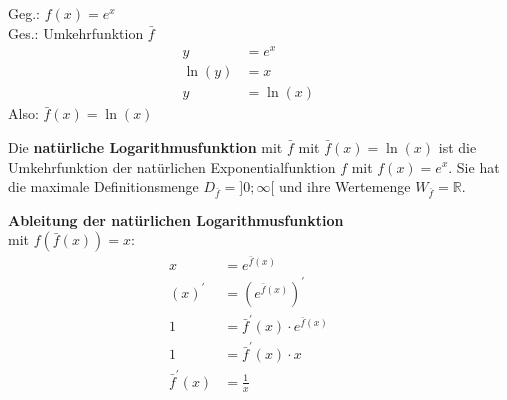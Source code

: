 \begin{minipage}{0.35\textwidth}
    Geg.: $f(x) = e^x$\\
    Ges.: Umkehrfunktion $\bar{f}$
    \begin{align*}
        y & = e^x && \\
        \ln{(y)} & = x && \\
        y & = \ln{(x)} &&
    \end{align*}
    Also: $\bar{f}(x) = \ln{(x)}$
\end{minipage}
\begin{minipage}{0.65\textwidth}
\end{minipage}
\begin{definition}
    Die \textbf{natürliche Logarithmusfunktion} mit $\bar{f}$ mit $\bar{f}(x) = \ln{(x)}$ ist die Umkehrfunktion der natürlichen Exponentialfunktion $f$ mit $f(x) = e^x$. Sie hat die maximale Definitionsmenge $D_{\bar{f}} = ]0;\infty[$ und ihre Wertemenge $W_{\bar{f}} = \mathbb{R}$.
\end{definition}

\textbf{Ableitung der natürlichen Logarithmusfunktion}\\
mit $f(\bar{f}(x)) = x$:
\begin{align*}
    x  & = e^{\bar{f}(x)} && \\
    (x)^\prime & = \left(e^{\bar{f}(x)}\right)^\prime && \\
    1 & = \bar{f}^\prime(x) \cdot e^{\bar{f}(x)} && \\
    1 & = \bar{f}^\prime(x) \cdot x && \\
    \bar{f}^\prime(x) & = \frac{1}{x} &&
\end{align*}

